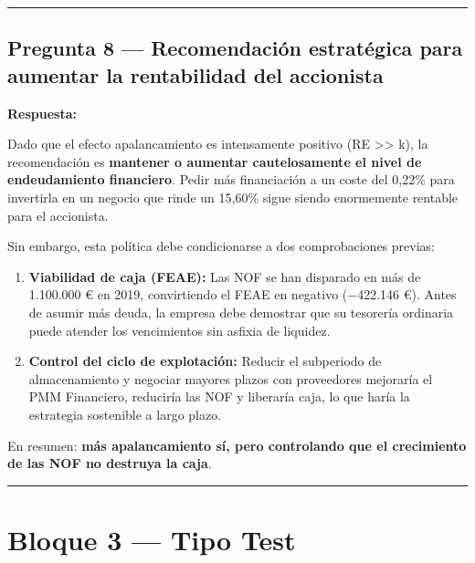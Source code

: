 \documentclass[12pt]{book} %
\providecommand{\tightlist}{%
  \setlength{\itemsep}{0pt}\setlength{\parskip}{0pt}}
\begin{document}
\begin{center}\rule{0.5\linewidth}{0.5pt}\end{center}

\hypertarget{pregunta-8-recomendaciuxf3n-estratuxe9gica-para-aumentar-la-rentabilidad-del-accionista}{%
\subsection{Pregunta 8 --- Recomendación estratégica para aumentar la
rentabilidad del
accionista}\label{pregunta-8-recomendaciuxf3n-estratuxe9gica-para-aumentar-la-rentabilidad-del-accionista}}

\textbf{Respuesta:}

Dado que el efecto apalancamiento es intensamente positivo (RE
\textgreater\textgreater{} k), la recomendación es \textbf{mantener o
aumentar cautelosamente el nivel de endeudamiento financiero}. Pedir más
financiación a un coste del 0,22\% para invertirla en un negocio que
rinde un 15,60\% sigue siendo enormemente rentable para el accionista.

Sin embargo, esta política debe condicionarse a dos comprobaciones
previas:

\begin{enumerate}
\def\labelenumi{\arabic{enumi}.}
\tightlist
\item
  \textbf{Viabilidad de caja (FEAE):} Las NOF se han disparado en más de
  1.100.000 € en 2019, convirtiendo el FEAE en negativo (−422.146 €).
  Antes de asumir más deuda, la empresa debe demostrar que su tesorería
  ordinaria puede atender los vencimientos sin asfixia de liquidez.
\item
  \textbf{Control del ciclo de explotación:} Reducir el subperiodo de
  almacenamiento y negociar mayores plazos con proveedores mejoraría el
  PMM Financiero, reduciría las NOF y liberaría caja, lo que haría la
  estrategia sostenible a largo plazo.
\end{enumerate}

En resumen: \textbf{más apalancamiento sí, pero controlando que el
crecimiento de las NOF no destruya la caja}.

\begin{center}\rule{0.5\linewidth}{0.5pt}\end{center}

\hypertarget{bloque-3-tipo-test}{%
\section{Bloque 3 --- Tipo Test}\label{bloque-3-tipo-test}}
\end{document}
